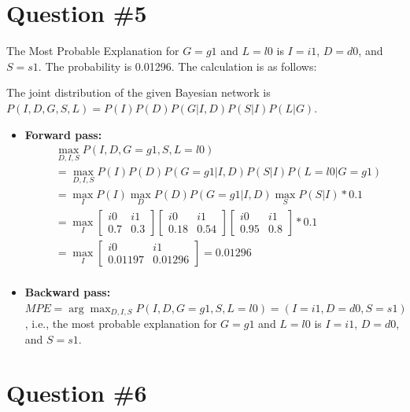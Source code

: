 \documentclass[conference]{styles/acmsiggraph}
\begin{document}
\section{Question \#5}
The Most Probable Explanation for $G=g1$ and $L=l0$ is $I=i1$, $D=d0$, and $S=s1$. The probability is 0.01296. The calculation is as follows:

The joint distribution of the given Bayesian network is $P(I,D,G,S,L) = P(I) P(D) P(G|I,D) P(S|I) P(L|G)$.
\begin{itemize}[leftmargin=*]
	\setlength{\itemsep}{0pt}
	\setlength{\parsep}{0pt}
	\setlength{\parskip}{0pt}
	\item \textbf{Forward pass:}
\begin{equation}
	\begin{aligned}
		& \max_{D,I,S} P(I,D,G=g1,S,L=l0)\\
		&= \max_{D,I,S} P(I)P(D)P(G=g1|I, D)P(S|I)P(L=l0|G=g1)\\
		&= \max_{I} P(I) \max_D P(D)P(G=g1|I, D) \max_S P(S|I) * 0.1 \\
		&= \max_{I} \left[ \begin{array}{cc}
			i0 & i1\\
			0.7 & 0.3
			\end{array}\right] 
			\left[ \begin{array}{cc}
			i0 & i1\\
			0.18 & 0.54
			\end{array}\right] 
			\left[ \begin{array}{cc}
			i0 & i1\\
			0.95 & 0.8
			\end{array}\right]* 0.1 \\
		&= \max_{I} \left[ \begin{array}{cc}
			i0 & i1\\
			0.01197 & 0.01296
			\end{array}\right] = 0.01296 \\
	\end{aligned}
\end{equation}
	\item \textbf{Backward pass:} $MPE = \arg\max_{D,I,S} P(I,D,G=g1,S,L=l0) = (I=i1, D=d0, S=s1)$, i.e., the most probable explanation for $G=g1$ and $L=l0$ is $I=i1$, $D=d0$, and $S=s1$.
\end{itemize}

\section{Question \#6}
\end{document}
